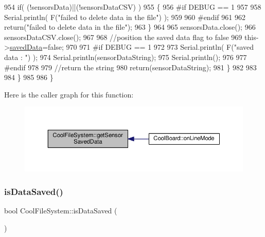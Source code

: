 \begin{DoxyCode}
954             \textcolor{keywordflow}{if}( (!sensorsData)||(!sensorsDataCSV) ) 
955             \{
956 \textcolor{preprocessor}{            #if DEBUG == 1}
957         
958                 Serial.println( F(\textcolor{stringliteral}{"failed to delete data in the file"}) );
959         
960 \textcolor{preprocessor}{            #endif}
961 
962                 \textcolor{keywordflow}{return}(\textcolor{stringliteral}{"failed to delete data in the file"});
963             \}
964 
965             sensorsData.close();
966             sensorsDataCSV.close();
967 
968             \textcolor{comment}{//position the saved data flag to false}
969             this->\hyperlink{classCoolFileSystem_ad398e0c5c41a0c88acdf5d672aa71351}{savedData}=\textcolor{keyword}{false}; 
970             
971 \textcolor{preprocessor}{        #if DEBUG == 1 }
972 
973             Serial.println( F(\textcolor{stringliteral}{"saved data : "}) );
974             Serial.println(sensorDataString);
975             Serial.println();
976         
977 \textcolor{preprocessor}{        #endif}
978 
979             \textcolor{comment}{//return the string}
980             \textcolor{keywordflow}{return}(sensorDataString);       
981         \}
982         
983         
984     \}
985 
986 \}
\end{DoxyCode}
Here is the caller graph for this function\+:\nopagebreak
\begin{figure}[H]
\begin{center}
\leavevmode
\includegraphics[width=350pt]{classCoolFileSystem_a5c58bca3735c0ed3efb268d70ef998ef_icgraph}
\end{center}
\end{figure}
\mbox{\label{classCoolFileSystem_a5a7eaeea7a9fbf8aaef651d862fa3b5b}} 
\subsubsection{\texorpdfstring{is\+Data\+Saved()}{isDataSaved()}}
{\footnotesize\ttfamily bool Cool\+File\+System\+::is\+Data\+Saved (\begin{DoxyParamCaption}{ }\end{DoxyParamCaption})}

